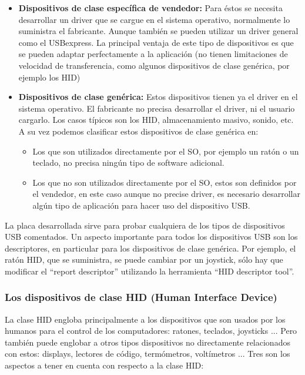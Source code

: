 \documentclass[a4paper, 11pt]{article}
\begin{document}
\begin{itemize}
    \item \textbf{Dispositivos de clase específica de vendedor:} Para éstos se
        necesita desarrollar un driver que se cargue en el sistema operativo,
        normalmente lo suministra el fabricante. Aunque también se pueden
        utilizar un driver general como el USBexpress. La principal ventaja de
        este tipo de dispositivos es que se pueden adaptar perfectamente a la
        aplicación (no tienen limitaciones de velocidad de transferencia, como
        algunos dispositivos de clase genérica, por ejemplo los HID)

    \item \textbf{Dispositivos de clase genérica:} Estos dispositivos tienen ya
        el driver en el sistema operativo. El fabricante no precisa desarrollar
        el driver, ni el usuario cargarlo. Los casos típicos son los HID,
        almacenamiento masivo, sonido, etc. A su vez podemos clasificar estos
        dispositivos de clase genérica en:
        \begin{itemize}
            \item Los que son utilizados directamente por el SO, por ejemplo un
                ratón o un teclado, no precisa ningún tipo de software
                adicional.

            \item Los que no son utilizados directamente por el SO, estos son
                definidos por el vendedor, en este caso aunque no precise
                driver, es necesario desarrollar algún tipo de aplicación para
                hacer uso del dispositivo USB.
        \end{itemize}
\end{itemize}

La placa desarrollada sirve para probar cualquiera de los tipos de dispositivos
USB comentados. Un aspecto importante para todos los dispositivos USB son los
descriptores, en particular para los dispositivos de clase genérica. Por
ejemplo, el ratón HID, que se suministra, se puede cambiar por un joystick,
sólo hay que modificar el “report descriptor” utilizando la herramienta “HID
descriptor tool”.

\subsubsection{Los dispositivos de clase HID (Human Interface Device)}

La clase HID engloba principalmente a los dispositivos que son usados por los
humanos para el control de los computadores: ratones, teclados, joysticks ...
Pero también puede englobar a otros tipos dispositivos no directamente
relacionados con estos: displays, lectores de código, termómetros, voltímetros
...  Tres son los aspectos a tener en cuenta con respecto a la clase HID:
\end{document}

